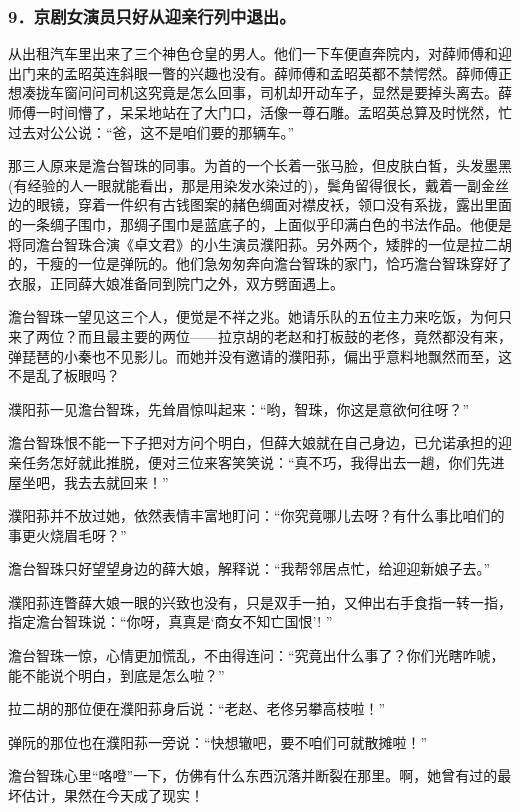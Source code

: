 \subsubsection*{9．京剧女演员只好从迎亲行列中退出。}
\par 从出租汽车里出来了三个神色仓皇的男人。他们一下车便直奔院内，对薛师傅和迎出门来的孟昭英连斜眼一瞥的兴趣也没有。薛师傅和孟昭英都不禁愕然。薛师傅正想凑拢车窗问问司机这究竟是怎么回事，司机却开动车子，显然是要掉头离去。薛师傅一时间懵了，呆呆地站在了大门口，活像一尊石雕。孟昭英总算及时恍然，忙过去对公公说：“爸，这不是咱们要的那辆车。”
\par 那三人原来是澹台智珠的同事。为首的一个长着一张马脸，但皮肤白皙，头发墨黑(有经验的人一眼就能看出，那是用染发水染过的)，鬓角留得很长，戴着一副金丝边的眼镜，穿着一件织有古钱图案的赭色绸面对襟皮袄，领口没有系拢，露出里面的一条绸子围巾，那绸子围巾是蓝底子的，上面似乎印满白色的书法作品。他便是将同澹台智珠合演《卓文君》的小生演员濮阳荪。另外两个，矮胖的一位是拉二胡的，干瘦的一位是弹阮的。他们急匆匆奔向澹台智珠的家门，恰巧澹台智珠穿好了衣服，正同薛大娘准备同到院门之外，双方劈面遇上。
\par 澹台智珠一望见这三个人，便觉是不祥之兆。她请乐队的五位主力来吃饭，为何只来了两位？而且最主要的两位——拉京胡的老赵和打板鼓的老佟，竟然都没有来，弹琵琶的小秦也不见影儿。而她并没有邀请的濮阳荪，偏出乎意料地飘然而至，这不是乱了板眼吗？
\par 濮阳荪一见澹台智珠，先耸眉惊叫起来：“哟，智珠，你这是意欲何往呀？”
\par 澹台智珠恨不能一下子把对方问个明白，但薛大娘就在自己身边，已允诺承担的迎亲任务怎好就此推脱，便对三位来客笑笑说：“真不巧，我得出去一趟，你们先进屋坐吧，我去去就回来！”
\par 濮阳荪并不放过她，依然表情丰富地盯问：“你究竟哪儿去呀？有什么事比咱们的事更火烧眉毛呀？”
\par 澹台智珠只好望望身边的薛大娘，解释说：“我帮邻居点忙，给迎迎新娘子去。”
\par 濮阳荪连瞥薛大娘一眼的兴致也没有，只是双手一拍，又伸出右手食指一转一指，指定澹台智珠说：“你呀，真真是‘商女不知亡国恨’! ”
\par 澹台智珠一惊，心情更加慌乱，不由得连问：“究竟出什么事了？你们光瞎咋唬，能不能说个明白，到底是怎么啦？”
\par 拉二胡的那位便在濮阳荪身后说：“老赵、老佟另攀高枝啦！”
\par 弹阮的那位也在濮阳荪一旁说：“快想辙吧，要不咱们可就散摊啦！”
\par 澹台智珠心里“咯噔”一下，仿佛有什么东西沉落并断裂在那里。啊，她曾有过的最坏估计，果然在今天成了现实！
